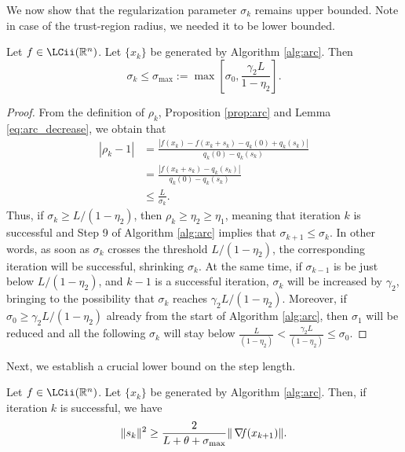 \documentclass[10pt,a4paper]{article}
\begin{document}
\noindent We now show that the regularization parameter $\sigma_k$ remains upper bounded. Note in case of the trust-region radius, we needed it to be lower bounded.

\begin{lemma}
	Let $f\in \LCii(\Rn)$. Let $\{x_k\}$ be generated by Algorithm \ref{alg:arc}. Then
	\begin{equation*}
		\sigma_k \leq \sigma_{\max} :=\max \left[ \sigma_0, \frac{\gamma_2 L}{1 - \eta_2} \right].
	\end{equation*}
\end{lemma}
\begin{proof}
	From the definition of $\rho_k$, Proposition \ref{prop:arc} and Lemma \ref{eq:arc_decrease}, we obtain that
	\begin{align*}
		|\rho_k - 1| &= \frac{|f(x_k) - f(x_k + s_k) - q_k(0) + q_k(s_k)|}{q_k(0) - q_k(s_k)} \\
		&= \frac{|f(x_k + s_k) - q_k(s_k)|}{q_k(0) - q_k(s_k)} \\
		&\leq \frac{L}{\sigma_k}.
	\end{align*}
	Thus, if $\sigma_k \geq L/(1 - \eta_2)$, then $\rho_k \geq \eta_2\geq\eta_1$, meaning that iteration $k$ is successful and Step 9 of Algorithm \ref{alg:arc} implies that $\sigma_{k+1} \leq \sigma_k$. In other words, as soon as $\sigma_k$ crosses the threshold $L/(1 - \eta_2)$, the corresponding iteration will be successful, shrinking $\sigma_k$. At the same time, if $\sigma_{k-1}$ is be just below $L/(1 - \eta_2)$, and $k-1$ is a successful iteration, $\sigma_k$ will be increased by $\gamma_2$, bringing to the possibility that $\sigma_k$ reaches $\gamma_2L/(1 - \eta_2)$. Moreover, if $\sigma_0\geq \gamma_2L/(1 - \eta_2)$ already from the start of Algorithm \ref{alg:arc}, then $\sigma_1$ will be reduced and all the following $\sigma_k$ will stay below $\frac{L}{(1 - \eta_2)}<\frac{\gamma_2L}{(1 - \eta_2)}\leq \sigma_0$. 	 
\end{proof}

\noindent Next, we establish a crucial lower bound on the step length.

\begin{lemma}
	Let $f\in \LCii(\Rn)$. Let $\{x_k\}$ be generated by Algorithm \ref{alg:arc}. Then, if iteration $k$ is successful, we have
	\begin{equation*}
		\|s_k\|^2 \geq \frac{2}{L + \theta + \sigma_{\max}} \|\operatorname*{\mathit{\nabla \!f}}(x_{k+1})\|.
	\end{equation*}
\end{lemma}
\end{document}
